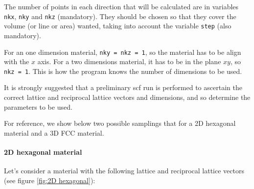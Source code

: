 \documentclass[a4paper,12pt]{report}
\begin{document}
 The number of points in each direction that will be calculated are in variables
 \verb|nkx|, \verb|nky| and \verb|nkz| (mandatory).
 They should be chosen so that they cover the volume (or line or area) wanted,
 taking into account the variable \verb|step| (also mandatory).

 For an one dimension material, \verb|nky = nkz = 1|, so the material has to be align with the $x$ axis.
 For a two dimensions material, it has to be in the plane $xy$, so \verb|nkz = 1|.
 This is how the program knows the number of dimensions to be used.

 It is strongly suggested that a preliminary scf run is performed to ascertain the correct
 lattice and reciprocal lattice vectors and dimensions,
 and so determine the parameters to be used.

 For reference, we show below two possible samplings that for a 2D hexagonal material
 and a 3D FCC material.

 \paragraph{2D hexagonal material}

 Let's consider a material with the following lattice and reciprocal lattice vectors
 (see figure \ref{fig:2D hexagonal}):
\medskip
\end{document}
